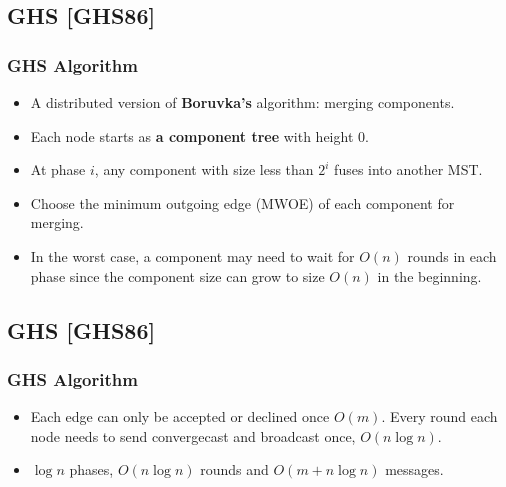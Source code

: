 \subsection{GHS [GHS86]}
\begin{frame}
\frametitle{GHS Algorithm}
\begin{itemize}
    \item A distributed version of \textbf{Boruvka's} algorithm: merging components.
    \item Each node starts as \textbf{a component tree} with height 0.
    \item At phase $i$, any component with size less than $2^i$ fuses into another MST.
    \item Choose the minimum outgoing edge (MWOE) of each component for merging.
    \item In the worst case, a component may need to wait for $O(n)$ rounds in each phase since the component size can grow to size $O(n)$ in the beginning. 
\end{itemize}
\end{frame}

\subsection{GHS [GHS86]}
\begin{frame}
\frametitle{GHS Algorithm}
\begin{itemize}
    \item Each edge can only be accepted or declined once $O(m)$. Every round each node needs to send convergecast and broadcast once, $O(n \log n)$.
    \item $\log n$ phases, $O(n \log n)$ rounds and $O(m + n \log n)$ messages.
\end{itemize}
\end{frame}


